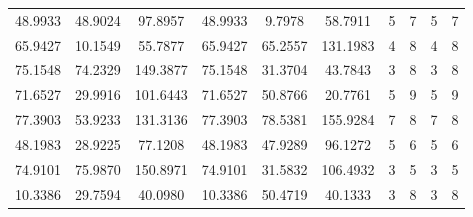 \documentclass[withoutpreface,bwprint]{cumcmthesis} %
\begin{document}
\begin{appendices}
\begin{table}[htbp!]
\begin{tabular}{@{}cccccccccc@{}}
						48.9933                          & 48.9024                          & 97.8957                          & 48.9933                          & 9.7978                           & 58.7911                          & 5                    & 7                    & 5                      & 7                      \\
						65.9427                          & 10.1549                          & 55.7877                          & 65.9427                          & 65.2557                          & 131.1983                         & 4                    & 8                    & 4                      & 8                      \\
						75.1548                          & 74.2329                          & 149.3877                         & 75.1548                          & 31.3704                          & 43.7843                          & 3                    & 8                    & 3                      & 8                      \\
						71.6527                          & 29.9916                          & 101.6443                         & 71.6527                          & 50.8766                          & 20.7761                          & 5                    & 9                    & 5                      & 9                      \\
						77.3903                          & 53.9233                          & 131.3136                         & 77.3903                          & 78.5381                          & 155.9284                         & 7                    & 8                    & 7                      & 8                      \\
						48.1983                          & 28.9225                          & 77.1208                          & 48.1983                          & 47.9289                          & 96.1272                          & 5                    & 6                    & 5                      & 6                      \\
						74.9101                          & 75.9870                          & 150.8971                         & 74.9101                          & 31.5832                          & 106.4932                         & 3                    & 5                    & 3                      & 5                      \\
						10.3386                          & 29.7594                          & 40.0980                          & 10.3386                          & 50.4719                          & 40.1333                          & 3                    & 8                    & 3                      & 8                      \\

\end{tabular}
\end{table}
\end{appendices}
\end{document}
